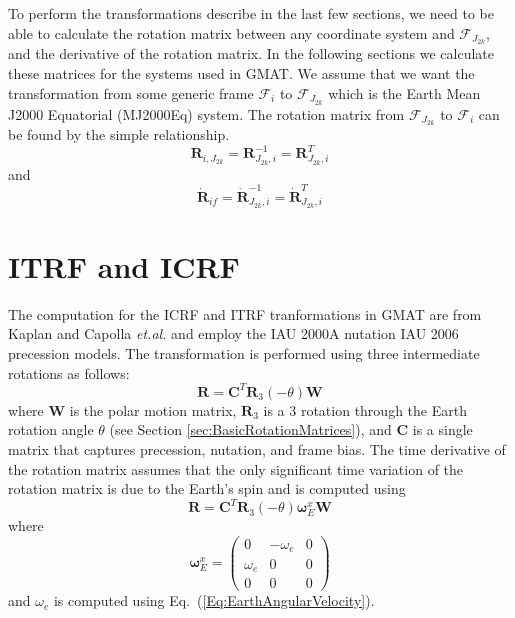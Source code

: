 To perform the transformations describe in the last few sections, we
need to be able to calculate the rotation matrix between any
coordinate system and $\mathcal{F}_{J_{2k}}$, and the derivative of
the rotation matrix. In the following sections we calculate these
matrices for the systems used in GMAT.  We assume that we want the
transformation from some generic frame $\mathcal{F}_i$ to
$\mathcal{F}_{J_{2k}}$ which is the Earth Mean J2000 Equatorial
(MJ2000Eq) system.  The rotation matrix from $\mathcal{F}_{J_{2k}}$
to $\mathcal{F}_i$ can be found by the simple relationship.
%
\begin{equation}
      \mathbf{R}_{i,J_{2k}} = \mathbf{R}_{J_{2k},i}^{-1} = \mathbf{R}_{J_{2k},i}^{T}
\end{equation}
%
and
%
\begin{equation}
      \dot{\mathbf{R}}_{if} = \dot{\mathbf{R}}_{J_{2k},i}^{-1} = \dot{\mathbf{R}}_{J_{2k},i}^{T}
\end{equation}




\clearpage

\section{ITRF and ICRF}

The computation for the ICRF and ITRF tranformations in GMAT are from Kaplan\cite{Kaplan:05} and Capolla\cite{Coppola:etal:05} \emph{et.al.} and employ the IAU 2000A nutation IAU 2006 precession models.  The transformation is performed using three intermediate rotations as follows:
%
\begin{equation}
     \mathbf{R} = \mathbf{C}^T\mathbf{R}_3(-\theta)\mathbf{W}
\end{equation}
%
where $\mathbf{W}$ is the polar motion matrix, $\mathbf{R}_3$ is a 3 rotation through the Earth rotation angle $\theta$ (see Section \ref{sec:BasicRotationMatrices}), and
$\mathbf{C}$ is a single matrix that captures precession, nutation, and frame bias.
The time derivative of the rotation matrix assumes that the only significant time variation of the rotation matrix is due to the Earth's spin and is computed using
%
\begin{equation}
     \mathbf{R} = \mathbf{C}^T\mathbf{R}_3(-\theta)\boldsymbol{\omega}_E^x\mathbf{W}
\end{equation}
%
where
%
\begin{equation}
   \boldsymbol{\omega}_E^x =
   \left(\begin{array} {ccc}
     0 & -\omega_e & 0 \\
     \omega_e & 0 & 0 \\
     0 & 0 & 0
   \end{array}\right)
\end{equation}
%
and $\omega_e$ is computed using Eq.~(\ref{Eq:EarthAngularVelocity}).

